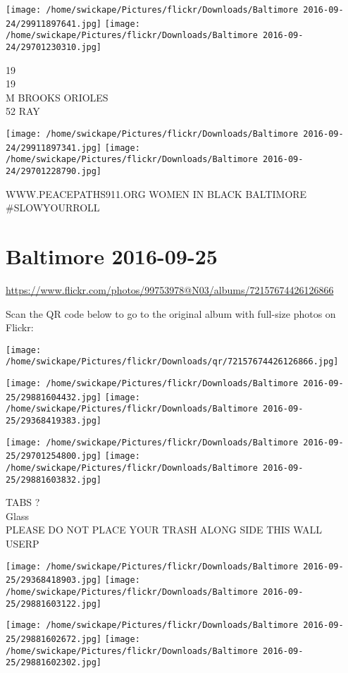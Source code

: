 \documentclass[10pt,letterpaper]{article}
\begin{document}
\texttt{[image: /home/swickape/Pictures/flickr/Downloads/Baltimore 2016-09-24/29911897641.jpg]}
\texttt{[image: /home/swickape/Pictures/flickr/Downloads/Baltimore 2016-09-24/29701230310.jpg]}

19\\
19\\
M BROOKS ORIOLES\\
52 RAY
\pagebreak

\texttt{[image: /home/swickape/Pictures/flickr/Downloads/Baltimore 2016-09-24/29911897341.jpg]}
\texttt{[image: /home/swickape/Pictures/flickr/Downloads/Baltimore 2016-09-24/29701228790.jpg]}

WWW.PEACEPATHS911.ORG WOMEN IN BLACK BALTIMORE\\
\#SLOWYOURROLL
\pagebreak

\section*{Baltimore 2016-09-25}

\url{https://www.flickr.com/photos/99753978@N03/albums/72157674426126866}

Scan the QR code below to go to the original album with full-size photos on Flickr:

\texttt{[image: /home/swickape/Pictures/flickr/Downloads/qr/72157674426126866.jpg]}
\pagebreak

\texttt{[image: /home/swickape/Pictures/flickr/Downloads/Baltimore 2016-09-25/29881604432.jpg]}
\texttt{[image: /home/swickape/Pictures/flickr/Downloads/Baltimore 2016-09-25/29368419383.jpg]}

\texttt{[image: /home/swickape/Pictures/flickr/Downloads/Baltimore 2016-09-25/29701254800.jpg]}
\texttt{[image: /home/swickape/Pictures/flickr/Downloads/Baltimore 2016-09-25/29881603832.jpg]}

TABS ?\\
Glass\\
PLEASE DO NOT PLACE YOUR TRASH ALONG SIDE THIS WALL\\
USERP
\pagebreak

\texttt{[image: /home/swickape/Pictures/flickr/Downloads/Baltimore 2016-09-25/29368418903.jpg]}
\texttt{[image: /home/swickape/Pictures/flickr/Downloads/Baltimore 2016-09-25/29881603122.jpg]}

\texttt{[image: /home/swickape/Pictures/flickr/Downloads/Baltimore 2016-09-25/29881602672.jpg]}
\texttt{[image: /home/swickape/Pictures/flickr/Downloads/Baltimore 2016-09-25/29881602302.jpg]}
\end{document}
